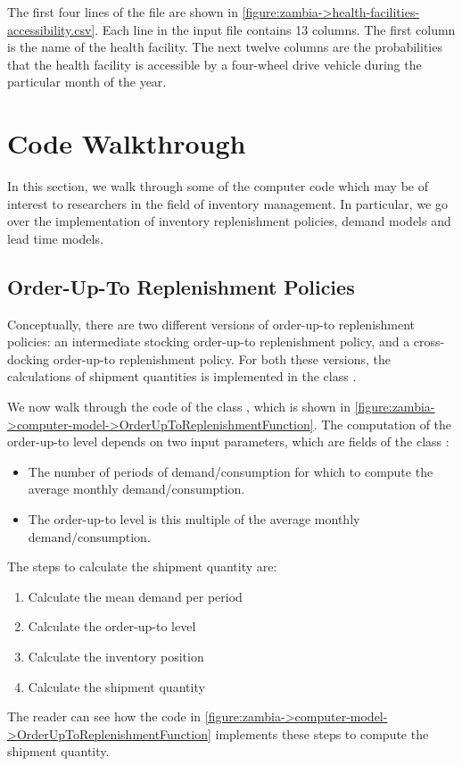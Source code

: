 The first four lines of the file are shown in
\autoref{figure:zambia->health-facilities-accessibility.csv}.
Each line in the input file contains 13 columns.
The first column is the name of the health facility.
The next twelve columns are the probabilities
that the health facility is accessible by a four-wheel drive vehicle
during the particular month of the year.





\section{Code Walkthrough}

In this section,
we walk through some of the computer code
which may be of interest to researchers in the field of inventory management.
In particular, we go over the implementation of
inventory replenishment policies,
demand models and lead time models.



\subsection{Order-Up-To Replenishment Policies}

Conceptually, there are two different versions
of order-up-to replenishment policies:
an intermediate stocking order-up-to replenishment policy,
and a cross-docking order-up-to replenishment policy.
For both these versions,
the calculations of shipment quantities
is implemented in the class .

We now walk through the code of the class
,
which is shown in
\autoref{figure:zambia->computer-model->OrderUpToReplenishmentFunction}.
The computation of the order-up-to level depends on two input parameters,
which are fields of the class :
\begin{itemize}
\item
{}
The number of periods of demand/consumption
for which to compute the average monthly demand/consumption.
\item
{}
The order-up-to level is this multiple
of the average monthly demand/consumption.
\end{itemize}
The steps to calculate the shipment quantity are:
\begin{enumerate}
\item Calculate the mean demand per period
\item Calculate the order-up-to level
\item Calculate the inventory position
\item Calculate the shipment quantity
\end{enumerate}
The reader can see how the code in
\autoref{figure:zambia->computer-model->OrderUpToReplenishmentFunction}
implements these steps to compute the shipment quantity.


